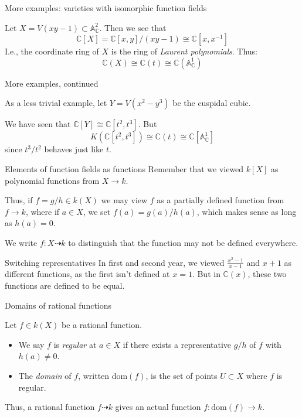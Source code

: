 \documentclass{beamer}
\newcommand{\C}{\mathbb{C}}
\newcommand{\A}{\mathbb{A}}
\begin{document}
\begin{frame}{More examples: varieties with isomorphic function fields}
  \begin{example} Let $X=V(xy-1)\subset \A^2_\C$.  Then we see that
    $$\C[X]=\C[x,y]/(xy-1)\cong \C[x,x^{-1}]$$
    I.e., the coordinate ring of $X$ is the ring of \emph{Laurent polynomials}.  Thus:
    $$\C(X)\cong \C(t)\cong \C(\A^1_\C)$$
\end{example}
  \end{frame}

\begin{frame}{More examples, continued}
  \begin{example} As a less trivial example, let $Y=V(x^2-y^3)$ be the cuspidal cubic.

    We have seen that $\C[Y]\cong \C[t^2, t^3]$.  But
    $$K(\C[t^2, t^3])\cong \C(t)\cong \C[\A^1_\C]$$
    since $t^3/t^2$ behaves just like $t$.  
     \end{example}
\end{frame}

\begin{frame}{Elements of function fields as functions}
  Remember that we viewed $k[X]$ as polynomial functions from $X\to k$.

  Thus, if $f=g/h\in k(X)$ we may view $f$ as a partially defined function from $f\to k$, where if $a\in X$, we set $f(a)=g(a)/h(a)$, which makes sense as long as $h(a)=0$.

  We write $f:X\dashrightarrow k$ to distinguish that the function may not be defined everywhere.
  \begin{block}{Switching representatives}
    In first and second year, we viewed $\frac{x^2-1}{x-1}$ and $x+1$ as different functions, as the first isn't defined at $x=1$.  But in $\C(x)$, these two functions are defined to be equal.  
  \end{block}
  \end{frame}
\begin{frame}{Domains of rational functions}
\begin{definition}
  Let $f\in k(X)$ be a rational function.
  \begin{itemize}
  \item We say $f$ is \emph{regular} at $a\in X$ if \alert{there exists} a representative $g/h$ of $f$ with $h(a)\neq 0$.
  \item The \emph{domain} of $f$, written $\text{dom}(f)$, is the set of points $U\subset X$ where $f$ is regular.
  \end{itemize}
  \end{definition}
  Thus, a rational function $f\dashrightarrow k$ gives an actual function $f:\text{dom}(f)\to k$.
  \end{frame}
\end{document}
